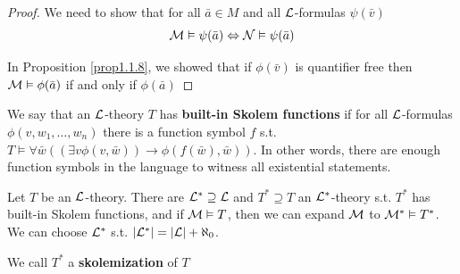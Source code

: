 \documentclass[11pt]{article}
\begin{document}
\begin{proof}
We need to show that for all \(\bar{a}\in M\) and all \(\mathcal{L}\)-formulas
\(\psi(\bar{v})\)
\begin{equation*}
\mathcal{M}\vDash\psi(\bar{a})\Leftrightarrow\mathcal{N}\vDash\psi(\bar{a})
\end{equation*}

In Proposition \ref{prop1.1.8}, we showed that if \(\phi(\bar{v})\) is quantifier
free then \(\mathcal{M}\vDash\phi(\bar{a})\) if and only if \(\phi(\bar{a})\)
\end{proof}

We say that an \(\mathcal{L}\)-theory \(T\) has \textbf{built-in Skolem functions} if for all
\(\mathcal{L}\)-formulas \(\phi(v,w_1,\dots,w_n)\) there is a function symbol \(f\) s.t.
\(T\vDash\forall\bar{w}((\exists v\phi(v,\bar{w}))\to\phi(f(\bar{w}),\bar{w}))\). In other words, there are
enough function symbols in the language to witness all existential statements.

\begin{lemma}[]
\label{lemma2.3.6}
Let \(T\) be an \(\mathcal{L}\)-theory. There are \(\mathcal{L}^*\supseteq\mathcal{L}\) and 
\(T^*\supseteq T\) an \(\mathcal{L}^*\)-theory s.t. \(T^*\) has built-in Skolem
functions, and if \(\mathcal{M}\vDash T\), then we can expand \(\mathcal{M}\) to 
\(\mathcal{M}^*\vDash T^*\). We can choose \(\mathcal{L}^*\) s.t.
\(\abs{\call^*}=\abs{\call}+\aleph_0\).

We call \(T^*\) a \textbf{skolemization} of \(T\)
\end{lemma}
\end{document}
